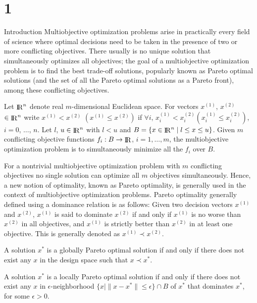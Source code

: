 \section{1}{Introduction}%
Multiobjective optimization problems arise in practically every field of 
science where optimal decisions need to be taken in the presence 
of two or more conflicting objectives. There usually is no unique solution 
that simultaneously optimizes all objectives; the goal of a multiobjective 
optimization problem is to find the best trade-off solutions, popularly known 
as Pareto optimal solutions (and the set of all the Pareto optimal solutions 
as a Pareto front), among these conflicting objectives. 

Let $\mathop{\rm I}\!\!\mathop{\rm R}\nolimits^n$ denote real $m$-dimensional Euclidean space. For vectors $x^{(1)}$, 
$x^{(2)}$ $\in \mathop{\rm I}\!\!\mathop{\rm R}\nolimits^n$ write $x^{(1)} < x^{(2)}$ $(x^{(1)}\le x^{(2)})$ if 
$\forall i$, $x^{(1)}_i<x^{(2)}_i (x^{(1)}_i\le x^{(2)}_i)$, $i=0$, $\ldots$, 
$n$. Let $l$, $u \in \mathop{\rm I}\!\!\mathop{\rm R}\nolimits^n$ with $l < u$ and $B = \{ x \in \mathop{\rm I}\!\!\mathop{\rm R}\nolimits^n \mid l\le x\le 
u\}$. Given $m$ conflicting objective functions $f_i: B \to \mathop{\rm I}\!\!\mathop{\rm R}\nolimits$, $i=1,\ldots,m$, 
the multiobjective optimization problem is to simultaneously minimize all the 
$f_i$ over $B$.

For a nontrivial multiobjective optimization problem with $m$ conflicting 
objectives no single solution can optimize all $m$ objectives simultaneously. 
Hence, a new notion of optimality, known as Pareto optimality, is generally used 
in the context of multiobjective optimization problems. Pareto optimality 
generally defined using a dominance relation is as follows: Given two decision 
vectors $x^{(1)}$ and $x^{(2)}$, $x^{(1)}$ is said to dominate $x^{(2)}$ if and 
only if $x^{(1)}$ is no worse than $x^{(2)}$ in all objectives, and $x^{(1)}$ 
is strictly better than $x^{(2)}$ in at least one objective. This is generally 
denoted as $x^{(1)}\prec x^{(2)}$.

A solution $x^*$ is a globally Pareto optimal solution if and only if there 
does not exist any $x$ in the design space such that $x\prec x^*$. 

A solution $x^*$ is a locally Pareto optimal solution if and only if there 
does not exist any $x$ in $\epsilon$-neighborhood $\bigl\{ x \mid\|x-x^*\| 
\le\epsilon \bigr\}\cap B$ of $x^*$ that dominates $x^*$, for some 
$\epsilon > 0$.  

